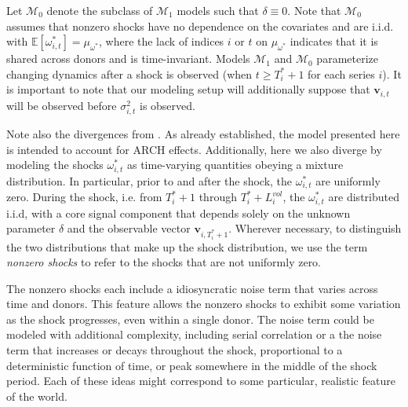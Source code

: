 \documentclass[11pt,3p,review,authoryear]{elsarticle}
\newcommand{\x}{\textbf{v}}
\def\mc#1{\mathcal{#1}} %
\def\E{\mathbb{E}} %
\def\mc#1{\mathcal{#1}}
\theoremstyle{definition}
\begin{document}
    Let $\mc{M}_{0}$ denote the subclass of $\mc{M}_{1}$ models such that $\delta \equiv 0$.  Note that $\mc{M}_{0}$ assumes that nonzero shocks have no dependence on the covariates and are i.i.d. with $\E[ \omega^{*}_{i,t}]=\mu_{\omega^{*}}$, where the lack of indices $i$ or $t$ on $\mu_{\omega^{*}}$ indicates that it is shared across donors and is time-invariant. Models $\mc{M}_{1}$ and $\mc{M}_{0}$ parameterize changing dynamics after a shock is observed (when $t \geq T_i^*+1$ for each series $i$). It is important to note that our modeling setup will additionally suppose that $\x_{i,t}$ will be observed before $\sigma_{i,t}^2$ is observed. 
    
Note also the divergences from \cite{lin2021minimizing}.  As already established, the model presented here is intended to account for ARCH effects.  Additionally, here we also diverge by modeling the shocks $\omega^{*}_{i,t}$ as time-varying quantities obeying a mixture distribution.  In particular, prior to and after the shock, the  $\omega^{*}_{i,t}$  are uniformly zero.  During the shock, i.e. from $T^{*}_{i}+1$ through $T^{*}_{i}+L^{vol}_{i}$, the $\omega^{*}_{i,t}$ are distributed i.i.d, with a core signal component that depends solely on the unknown parameter $\delta$ and the observable vector $\x_{i,T_{i}^{*}+1}$.  Wherever necessary, to distinguish the two distributions that make up the shock distribution, we use the term \textit{nonzero shocks} to refer to the shocks that are not uniformly zero.  

The nonzero shocks each include a idiosyncratic noise term that varies across time and donors.  This feature allows the nonzero shocks to exhibit some variation as the shock progresses, even within a single donor.  The noise term could be modeled with additional complexity, including serial correlation or a the noise term that increases or decays throughout the shock, proportional to a deterministic function of time, or peak somewhere in the middle of the shock period.  Each of these ideas might correspond to some particular, realistic feature of the world.
\end{document}
